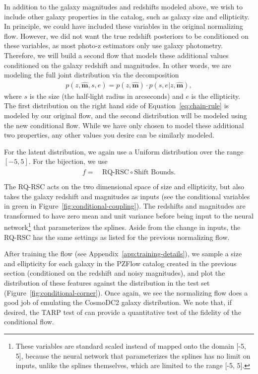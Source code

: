 \documentclass[twocolumn,twocolappendix]{aastex631}
\begin{document}
In addition to the galaxy magnitudes and redshifts modeled above, we wish to include other galaxy properties in the catalog, such as galaxy size and ellipticity.
In principle, we could have included these variables in the original normalizing flow.
However, we did not want the true redshift posteriors to be conditioned on these variables, as most photo-z estimators only use galaxy photometry.
Therefore, we will build a second flow that models these additional values conditioned on the galaxy redshift and magnitudes.
In other words, we are modeling the full joint distribution via the decomposition
\begin{align}
    p(z, \mathbf{\hat{m}}, s, e) = p(z, \mathbf{\hat{m}}) \cdot p(s, e | z, \mathbf{\hat{m}}),
    \label{eq:chain-rule}
\end{align}
where $s$ is the size (the half-light radius in arcseconds) and $e$ is the ellipticity.
The first distribution on the right hand side of Equation~\ref{eq:chain-rule} is modeled by our original flow, and the second distribution will be modeled using the new conditional flow.
While we have only chosen to model these additional two properties, any other values you desire can be similarly modeled.

For the latent distribution, we again use a Uniform distribution over the range $[-5, 5]$.
For the bijection, we use
\begin{align}
    \begin{split}
        f =& ~ \text{RQ-RSC} \circ \text{Shift Bounds}. \\
    \end{split}
\end{align}
The RQ-RSC acts on the two dimensional space of size and ellipticity, but also takes the galaxy redshift and magnitudes as inputs (see the conditional variables in green in Figure~\ref{fig:conditional-coupling}).
The redshifts and magnitudes are transformed to have zero mean and unit variance before being input to the neural network\footnote{These variables are standard scaled instead of mapped onto the domain [-5, 5], because the neural network that parameterizes the splines has no limit on inputs, unlike the splines themselves, which are limited to the range [-5, 5].} that parameterizes the splines.
Aside from the change in inputs, the RQ-RSC has the same settings as listed for the previous normalizing flow.

After training the flow (see Appendix~\ref{app:training-details}), we sample a size and ellipticity for each galaxy in the PZFlow catalog created in the previous section (conditioned on the redshift and noisy magnitudes), and plot the distribution of these features against the distribution in the test set (Figure~\ref{fig:conditional-corner}).
Once again, we see the normalizing flow does a good job of emulating the CosmoDC2 galaxy distribution.
We note that, if desired, the TARP test of \citet{lemos2023} can provide a quantitative test of the fidelity of the conditional flow. 
\end{document}
